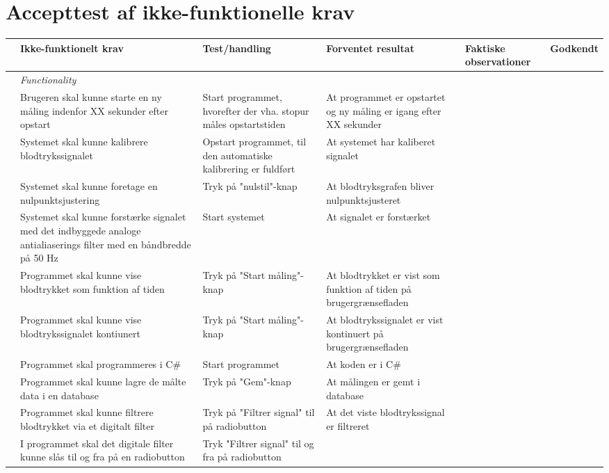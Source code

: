 \section{Accepttest af ikke-funktionelle krav}

\begin{longtabu} to 
	& Ikke-funktionelt krav & Test/handling & Forventet resultat & Faktiske observationer & Godkendt
	\\[-1ex] \midrule
	&  \textit{Functionality} &  &  & & \\ \midrule
	& Brugeren skal kunne starte en ny måling indenfor XX sekunder efter opstart & Start programmet, hvorefter der vha. stopur måles opstartstiden & At programmet er opstartet og ny måling er igang efter XX sekunder &  & %
	\\ \midrule
	&  Systemet skal kunne kalibrere blodtrykssignalet & Opstart programmet, til den automatiske kalibrering er fuldført & At systemet har kaliberet signalet & & \\ \midrule
	& Systemet skal kunne foretage en nulpunktsjustering & Tryk på "nulstil"\--knap & At blodtryksgrafen bliver nulpunktsjusteret & & \\ \midrule
	& Systemet skal kunne forstærke signalet med det indbyggede analoge antialiaserings filter med en båndbredde på 50 Hz & Start systemet & At signalet er forstærket & & \\ \midrule
	& Programmet skal kunne vise blodtrykket som funktion af tiden & Tryk på "Start måling"\--knap & At blodtrykket er vist som funktion af tiden på brugergrænsefladen & & \\ \midrule
	& Programmet skal kunne vise blodtrykssignalet kontiunert & Tryk på "Start måling"\--knap & At blodtrykssignalet er vist kontinuert på brugergrænsefladen & & \\ \midrule
	& Programmet skal programmeres i C\# & Start programmet & At koden er i C\# & & \\ \midrule
	& Programmet skal kunne lagre de målte data i en database & Tryk på "Gem"\--knap & At målingen er gemt i database & & \\ \midrule
	& Programmet skal kunne filtrere blodtrykket via et digitalt filter & Tryk på "Filtrer signal" til på radiobutton & At det viste blodtrykssignal er filtreret & & \\ \midrule
	& I programmet skal det digitale filter kunne slås til og fra på en radiobutton & Tryk "Filtrer signal" til og fra på radiobutton & & \\ \midrule

\end{longtabu}

